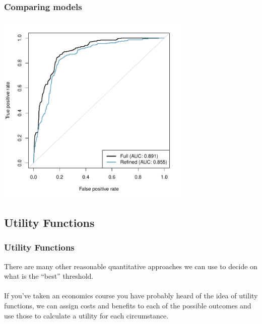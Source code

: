 \begin{frame}[fragile]
\frametitle{Comparing models}

\vspace{-8mm}

\begin{center}
\includegraphics[width=0.7\textwidth]{8-4_logistic_reg/figures/spam/ROC_comp.pdf}
\end{center}

\end{frame}


\subsection{Utility Functions}


\begin{frame}
\frametitle{Utility Functions}

There are many other reasonable quantitative approaches we can use to decide on what is the ``best'' threshold.\\
~\\
If you've taken an economics course you have probably heard of the idea of utility functions, we can assign costs and benefits to each of the possible  outcomes and use those to calculate a utility for each circumstance.

\end{frame}


